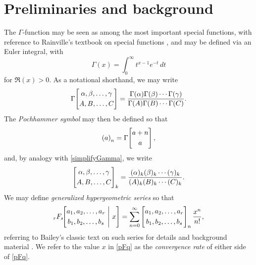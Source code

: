 \documentclass[12pt]{article}
\begin{document}
\section{Preliminaries and background}
 The $\Gamma$-function may be seen as among the most important special functions, 
 with reference to Rainville's textbook on special functions \cite[\S2]{Rainville1960}, 
 and may be defined 
 via an Euler integral, with 
\begin{equation}\label{displayintegral}
 \Gamma(x) = \int_{0}^{\infty} t^{x-1} e^{-t} \, dt 
\end{equation} 
 for $\Re(x) > 0$. As a notational shorthand, we may write 
\begin{equation}\label{simplifyGamma}
 \Gamma\!\left[ \begin{matrix} \alpha, \beta, \ldots, \gamma \vspace{1mm} \\ 
 A, B, \ldots, C \end{matrix} \right] = \frac{ \Gamma(\alpha) \Gamma(\beta) 
 \cdots \Gamma(\gamma) }{ \Gamma(A) \Gamma(B) \cdots \Gamma(C)}. 
\end{equation}
 The \emph{Pochhammer symbol} may then be defined so that 
\begin{equation}\label{origPoch}
 \left( a \right)_{n} = 
 \Gamma\!\left[ \begin{matrix} a + n \vspace{1mm} \\ 
 a \end{matrix} \right], 
\end{equation}
 and, by analogy with \eqref{simplifyGamma}, we write 
\begin{equation*}
 \left[ \begin{matrix} \alpha, \beta, \ldots, \gamma \vspace{1mm} \\ 
 A, B, \ldots, C \end{matrix} \right]_{k} = \frac{ (\alpha)_{k} (\beta)_{k} 
 \cdots (\gamma)_{k} }{ (A)_{k} (B)_{k} \cdots (C)_{k}}. 
\end{equation*}
 We may define \emph{generalized hypergeometric series} so that 
\begin{equation}\label{pFq}
 {}_{r}F_{s}\!\!\left[ \begin{matrix} 
 a_{1}, a_{2}, \ldots, a_{r} \vspace{1mm}\\ 
 b_{1}, b_{2}, \ldots, b_{s} \end{matrix} \ \Bigg| \ x 
 \right] = \sum_{n=0}^{\infty} 
 \left[ \begin{matrix} a_{1}, a_{2}, \ldots, a_{r} \vspace{1mm} \\ 
 b_{1}, b_{2}, \ldots, b_{s} \end{matrix} \right]_{n} \frac{x^{n}}{n!}, 
\end{equation}
 referring to Bailey's classic text on such series for details and background material \cite{Bailey1964}. We refer to the value $x$ in 
 \eqref{pFq} as the \emph{convergence rate} of either side of \eqref{pFq}. 
\end{document}
